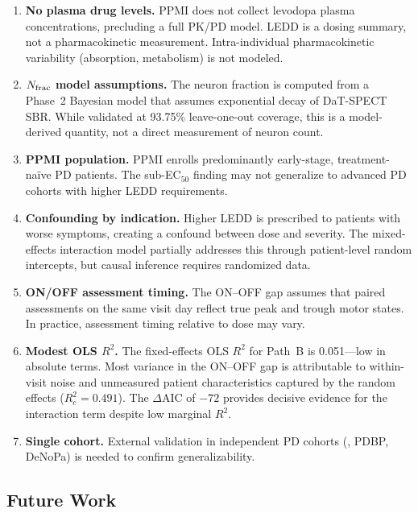 \begin{enumerate}
  \item \textbf{No plasma drug levels.} PPMI does not collect
    levodopa plasma concentrations, precluding a full PK/PD model.
    LEDD is a dosing summary, not a pharmacokinetic measurement.
    Intra-individual pharmacokinetic variability (absorption,
    metabolism) is not modeled.

  \item \textbf{$N_{\mathrm{frac}}$ model assumptions.} The neuron fraction is
    computed from a Phase~2 Bayesian model that assumes exponential
    decay of DaT-SPECT SBR. While validated at 93.75\% leave-one-out
    coverage, this is a model-derived quantity, not a direct measurement
    of neuron count.

  \item \textbf{PPMI population.} PPMI enrolls predominantly
    early-stage, treatment-na\"{i}ve PD patients. The sub-EC$_{50}$
    finding may not generalize to advanced PD cohorts with higher
    LEDD requirements.

  \item \textbf{Confounding by indication.} Higher LEDD is prescribed
    to patients with worse symptoms, creating a confound between dose
    and severity. The mixed-effects interaction model partially
    addresses this through patient-level random intercepts, but causal
    inference requires randomized data.

  \item \textbf{ON/OFF assessment timing.} The ON--OFF gap assumes
    that paired assessments on the same visit day reflect true peak
    and trough motor states. In practice, assessment timing relative
    to dose may vary.

  \item \textbf{Modest OLS $R^2$.} The fixed-effects OLS $R^2$ for
    Path~B is 0.051---low in absolute terms. Most variance in the
    ON--OFF gap is attributable to within-visit noise and unmeasured
    patient characteristics captured by the random effects ($R^2_c = 0.491$).
    The $\Delta$AIC of $-72$ provides decisive evidence for the
    interaction term despite low marginal $R^2$.

  \item \textbf{Single cohort.} External validation in independent
    PD cohorts (\eg, PDBP, DeNoPa) is needed to confirm
    generalizability.
\end{enumerate}


\subsection{Future Work}

